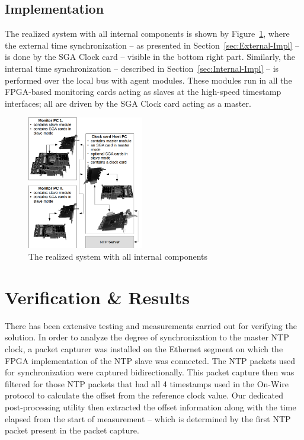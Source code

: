 \documentclass[journal]{IEEEtran}
\begin{document}
\subsection{Implementation}

The realized system with all internal components is shown by Figure~\ref{fig:realized-system}, where the external time
synchronization -- as presented in Section~\ref{sec:External-Impl} -- is done by the SGA Clock card -- visible in the
bottom right part. Similarly, the internal time synchronization -- described in Section~\ref{sec:Internal-Impl} --
is performed over the local bus with agent modules. These modules run in all the FPGA-based monitoring cards acting as slaves at the
high-speed timestamp interfaces; all are driven by the SGA Clock card acting as a master.

\begin{figure}[H]
    \centering
    \includegraphics[width=0.45\textwidth]{figures_raw/clock_architecture.png}
    \caption{The realized system with all internal components}
    \label{fig:realized-system}
\end{figure}

\section{Verification \& Results}


There has been extensive testing and measurements carried out for verifying the solution. In order to analyze the degree of
synchronization to the master NTP clock, a packet capturer was installed on the Ethernet
segment on which the FPGA implementation of the NTP slave was connected. The NTP packets used for synchronization were
captured bidirectionally. This packet capture then was filtered for those NTP packets that had all 4 timestamps used in
the On-Wire protocol to calculate the offset from the reference clock value. Our  dedicated post-processing utility then extracted the
offset information along with the time elapsed from the start of measurement -- which is determined by
the
first NTP packet present in the packet capture.
\end{document}
